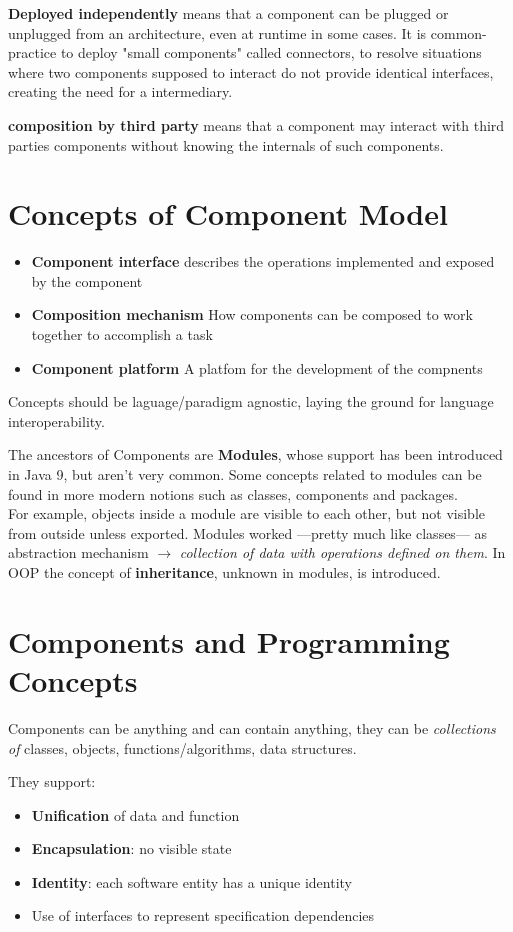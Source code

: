 \textbf{Deployed independently} means that a component can be plugged or unplugged from an architecture, even at runtime in some cases.
It is common-practice to deploy "small components" called connectors,
to resolve situations where two components supposed to interact do not provide identical interfaces,
creating the need for a intermediary.

\textbf{composition by third party} means that a component may interact with third parties components without knowing the internals of such components.

\section{Concepts of Component Model}
\begin{itemize}
    \item \textbf{Component interface} describes the operations implemented and exposed by the component
    \item \textbf{Composition mechanism} How components can be composed to work together to accomplish a task
    \item \textbf{Component platform} A platfom for the development of the compnents
\end{itemize}
Concepts should be laguage/paradigm agnostic, laying the ground for language interoperability.
\nl

The ancestors of Components are \textbf{Modules}, whose support has been introduced in Java 9, but aren't very common.
Some concepts related to modules can be found in more modern notions such as classes, components and packages.\\
For example, objects inside a module are visible to each other, but not visible from outside unless exported.
Modules worked ---pretty much like classes--- as abstraction mechanism $\rightarrow$ \textit{collection of data with operations defined on them}.
In OOP the concept of \textbf{inheritance}, unknown in modules, is introduced.
\nl


\section{Components and Programming Concepts}
Components can be anything and can contain anything, they can be \textit{collections of} classes, objects, functions/algorithms, data structures.\\
{They support:\ns
\begin{itemize}
	\item \textbf{Unification} of data and function
	\item \textbf{Encapsulation}: no visible state
	\item \textbf{Identity}: each software entity has a unique identity
	\item Use of interfaces to represent specification dependencies
\end{itemize}}

